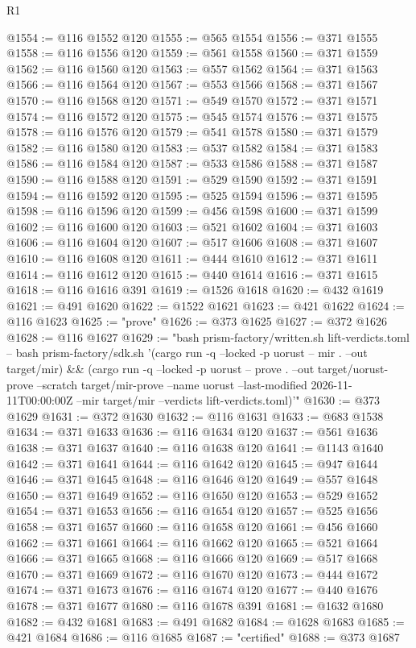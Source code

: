 \begin{lexlean}{R1}
\begin{coremodule}
@1554 := @116 @1552 @120
@1555 := @565 @1554
@1556 := @371 @1555
@1558 := @116 @1556 @120
@1559 := @561 @1558
@1560 := @371 @1559
@1562 := @116 @1560 @120
@1563 := @557 @1562
@1564 := @371 @1563
@1566 := @116 @1564 @120
@1567 := @553 @1566
@1568 := @371 @1567
@1570 := @116 @1568 @120
@1571 := @549 @1570
@1572 := @371 @1571
@1574 := @116 @1572 @120
@1575 := @545 @1574
@1576 := @371 @1575
@1578 := @116 @1576 @120
@1579 := @541 @1578
@1580 := @371 @1579
@1582 := @116 @1580 @120
@1583 := @537 @1582
@1584 := @371 @1583
@1586 := @116 @1584 @120
@1587 := @533 @1586
@1588 := @371 @1587
@1590 := @116 @1588 @120
@1591 := @529 @1590
@1592 := @371 @1591
@1594 := @116 @1592 @120
@1595 := @525 @1594
@1596 := @371 @1595
@1598 := @116 @1596 @120
@1599 := @456 @1598
@1600 := @371 @1599
@1602 := @116 @1600 @120
@1603 := @521 @1602
@1604 := @371 @1603
@1606 := @116 @1604 @120
@1607 := @517 @1606
@1608 := @371 @1607
@1610 := @116 @1608 @120
@1611 := @444 @1610
@1612 := @371 @1611
@1614 := @116 @1612 @120
@1615 := @440 @1614
@1616 := @371 @1615
@1618 := @116 @1616 @391
@1619 := @1526 @1618
@1620 := @432 @1619
@1621 := @491 @1620
@1622 := @1522 @1621
@1623 := @421 @1622
@1624 := @116 @1623
@1625 := "prove"
@1626 := @373 @1625
@1627 := @372 @1626
@1628 := @116 @1627
@1629 := "bash prism-factory/written.sh lift-verdicts.toml -- bash prism-factory/sdk.sh '(cargo run -q --locked -p uorust -- mir . --out target/mir) && (cargo run -q --locked -p uorust -- prove . --out target/uorust-prove --scratch target/mir-prove --name uorust --last-modified 2026-11-11T00:00:00Z --mir target/mir --verdicts lift-verdicts.toml)'"
@1630 := @373 @1629
@1631 := @372 @1630
@1632 := @116 @1631
@1633 := @683 @1538
@1634 := @371 @1633
@1636 := @116 @1634 @120
@1637 := @561 @1636
@1638 := @371 @1637
@1640 := @116 @1638 @120
@1641 := @1143 @1640
@1642 := @371 @1641
@1644 := @116 @1642 @120
@1645 := @947 @1644
@1646 := @371 @1645
@1648 := @116 @1646 @120
@1649 := @557 @1648
@1650 := @371 @1649
@1652 := @116 @1650 @120
@1653 := @529 @1652
@1654 := @371 @1653
@1656 := @116 @1654 @120
@1657 := @525 @1656
@1658 := @371 @1657
@1660 := @116 @1658 @120
@1661 := @456 @1660
@1662 := @371 @1661
@1664 := @116 @1662 @120
@1665 := @521 @1664
@1666 := @371 @1665
@1668 := @116 @1666 @120
@1669 := @517 @1668
@1670 := @371 @1669
@1672 := @116 @1670 @120
@1673 := @444 @1672
@1674 := @371 @1673
@1676 := @116 @1674 @120
@1677 := @440 @1676
@1678 := @371 @1677
@1680 := @116 @1678 @391
@1681 := @1632 @1680
@1682 := @432 @1681
@1683 := @491 @1682
@1684 := @1628 @1683
@1685 := @421 @1684
@1686 := @116 @1685
@1687 := "certified"
@1688 := @373 @1687

\end{coremodule}
\end{lexlean}

